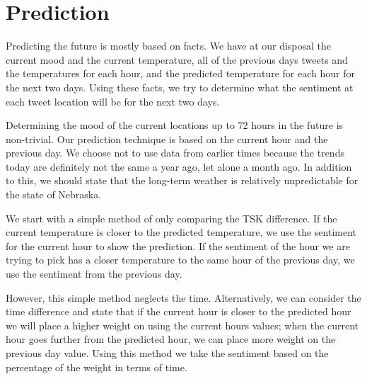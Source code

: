 
\section{Prediction}
\label{sec:pred}

Predicting the future is mostly based on facts. We have at our disposal the current mood and the current temperature, all of the previous days tweets and the temperatures for each hour, and the predicted temperature for each hour for the next two days. Using these facts, we try to determine what the sentiment at each tweet location will be for the next two days.

Determining the mood of the current locations up to 72 hours in the future is non-trivial. Our prediction technique is based on the current hour and the previous day. We choose not to use data from earlier times because the trends today are definitely not the same a year ago, let alone a month ago. In addition to this, we should state that the long-term weather is relatively unpredictable for the state of Nebraska.

We start with a simple method of only comparing the TSK difference. If the current temperature is closer to the predicted temperature, we use the sentiment for the current hour to show the prediction. If the sentiment of the hour we are trying to pick has a closer temperature to the same hour of the previous day, we use the sentiment from the previous day.

However, this simple method neglects the time. Alternatively, we can consider the time difference and state that if the current hour is closer to the predicted hour we will place a higher weight on using the current hours values; when the current hour goes further from the predicted hour, we can place more weight on the previous day value. %
Using this method we take the sentiment based on the percentage of the weight in terms of time.

